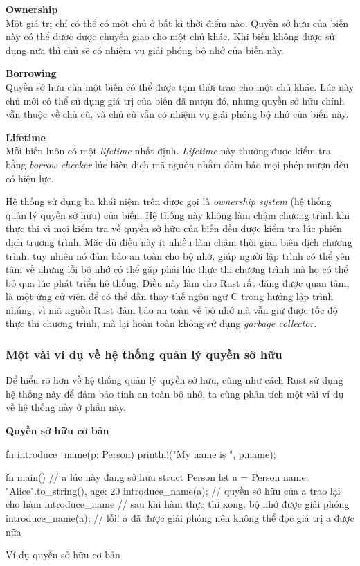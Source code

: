 \textbf{Ownership}\\
\indent Một giá trị chỉ có thể có một chủ ở bất kì thời điểm nào. Quyền sở hữu của biến này có thể được được chuyển giao cho một chủ khác.
Khi biến không được sử dụng nữa thì chủ sẽ có nhiệm vụ giải phóng bộ nhớ của biến này.

\textbf{Borrowing}\\
\indent Quyền sở hữu của một biến có thể được tạm thời trao cho một chủ khác. Lúc này chủ mới có thể sử dụng giá trị của biến đã mượn đó, nhưng quyền sở hữu chính vẫn thuộc về chủ cũ, và chủ cũ vẫn có nhiệm vụ giải phóng bộ nhớ của biến này.

\textbf{Lifetime}\\
\indent Mỗi biến luôn có một \emph{lifetime} nhất định. \emph{Lifetime} này thường được kiểm tra bằng \emph{borrow checker} lúc biên dịch mã nguồn nhằm đảm bảo mọi phép mượn đều có hiệu lực.

Hệ thống sử dụng ba khái niệm trên được gọi là \emph{ownership system} (hệ thống quản lý quyền sở hữu) của biến.
Hệ thống này không làm chậm chương trình khi thực thi vì mọi kiểm tra về quyền sở hữu của biến đều được kiểm tra lúc phiên dịch trương trình.
Mặc dù điều này ít nhiều làm chậm thời gian biên dịch chương trình, tuy nhiên nó đảm bảo an toàn cho bộ nhớ, giúp người lập trình có thể yên tâm về những lỗi bộ nhớ có thể gặp phải lúc thực thi chương trình mà họ có thể bỏ qua lúc phát triển hệ thống.
Điều này làm cho Rust rất đáng được quan tâm, là một ứng cử viên để có thể dần thay thế ngôn ngữ C trong hướng lập trình nhúng, vì mã nguồn Rust đảm bảo an toàn về bộ nhớ mà vẫn giữ được tốc độ thực thi chương trình, mà lại hoàn toàn không sử dụng \emph{garbage collector}.

\pagebreak
\subsubsection{Một vài ví dụ về hệ thống quản lý quyền sở hữu}
Để hiểu rõ hơn về hệ thống quản lý quyền sở hữu, cũng như cách Rust sử dụng hệ thống này để đảm bảo tính an toàn bộ nhớ, ta cùng phân tích một vài ví dụ về hệ thống này ở phần này.

\textbf{Quyền sở hữu cơ bản}
\begin{listing}[H]
\begin{rustcode}
fn introduce_name(p: Person) {
  println!("My name is {}", p.name);
}

fn main() {
  // a lúc này đang sở hữu struct Person
  let a = Person{ name: "Alice".to_string(), age: 20 }
  introduce_name(a); // quyền sở hữu của a trao lại cho hàm introduce_name
  // sau khi hàm thực thi xong, bộ nhớ được giải phóng
  introduce_name(a); // lỗi! a đã được giải phóng nên không thể đọc giá trị a được nữa
}
\end{rustcode}
\caption{Ví dụ quyền sở hữu cơ bản}
\label{code:rust_ownership_example}
\end{listing}

